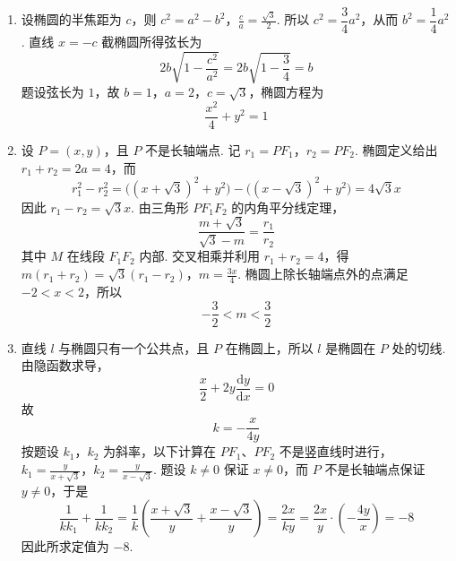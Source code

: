 \begin{solution}
\begin{enumerate}
\item
设椭圆的半焦距为 \(c\)，则
\(c^2=a^2-b^2\)，\(\frac{c}{a}=\frac{\sqrt3}{2}\).
所以 \(c^2=\dfrac34a^2\)，从而 \(b^2=\dfrac14a^2\). 直线 \(x=-c\) 截椭圆所得弦长为
\[
2b\sqrt{1-\frac{c^2}{a^2}}=2b\sqrt{1-\frac34}=b
\]
题设弦长为 \(1\)，故 \(b=1\)，\(a=2\)，\(c=\sqrt3\)，椭圆方程为
\[
\frac{x^2}{4}+y^2=1
\]

\item
设 \(P=(x,y)\)，且 \(P\) 不是长轴端点. 记
\(r_1=PF_1\)，\(r_2=PF_2\).
椭圆定义给出 \(r_1+r_2=2a=4\)，而
\[
r_1^2-r_2^2
=\bigl((x+\sqrt3)^2+y^2\bigr)
-\bigl((x-\sqrt3)^2+y^2\bigr)
=4\sqrt3x
\]
因此 \(r_1-r_2=\sqrt3x\). 由三角形 \(PF_1F_2\) 的内角平分线定理，
\[
\frac{m+\sqrt3}{\sqrt3-m}=\frac{r_1}{r_2}
\]
其中 \(M\) 在线段 \(F_1F_2\) 内部. 交叉相乘并利用 \(r_1+r_2=4\)，得
\(m(r_1+r_2)=\sqrt3(r_1-r_2)\)，\(m=\frac{3x}{4}\).
椭圆上除长轴端点外的点满足 \(-2<x<2\)，所以
\[
-\frac32<m<\frac32
\]

\item
直线 \(l\) 与椭圆只有一个公共点，且 \(P\) 在椭圆上，所以 \(l\) 是椭圆在 \(P\) 处的切线. 由隐函数求导，
\[
\frac{x}{2}+2y\frac{\mathrm dy}{\mathrm dx}=0
\]
故
\[
k=-\frac{x}{4y}
\]
按题设 \(k_1\)，\(k_2\) 为斜率，以下计算在 \(PF_1\)、\(PF_2\) 不是竖直线时进行，
\(k_1=\frac{y}{x+\sqrt3}\)，\(k_2=\frac{y}{x-\sqrt3}\).
题设 \(k\neq0\) 保证 \(x\neq0\)，而 \(P\) 不是长轴端点保证 \(y\neq0\)，于是
\[
\frac{1}{kk_1}+\frac{1}{kk_2}
=\frac1k\left(\frac{x+\sqrt3}{y}+\frac{x-\sqrt3}{y}\right)
=\frac{2x}{ky}
=\frac{2x}{y}\cdot\left(-\frac{4y}{x}\right)
=-8
\]
因此所求定值为 \(-8\).
\end{enumerate}
\end{solution}
